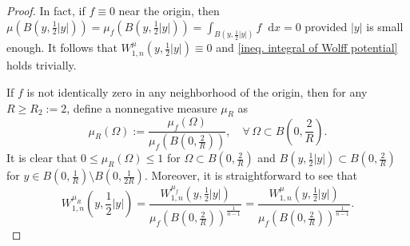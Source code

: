 \documentclass[10pt,a4paper]{amsart}
\numberwithin{equation}{section}
\newcommand{\dx}{\mathop{}\!\mathrm{d}x}
\begin{document}
\begin{proof}
    In fact, if $f\equiv 0$ near the origin, then $\mu(B(y,\frac{1}{2}|y|))=\mu_f(B(y,\frac{1}{2}|y|))=\int_{B(y,\frac{1}{2}|y|)}f\dx=0$ provided $|y|$ is small enough. It follows that $W_{1,n}^{\mu}(y,\frac{1}{2}|y|)\equiv 0$ and \cref{ineq. integral of Wolff potential} holds trivially.
    
    If $f$ is not identically zero in any neighborhood of the origin, then for any $R\geq R_2:=2$, define a nonnegative measure $\mu_R$ as 
    \[
        \mu_R(\Omega):=\frac{\mu_f(\Omega)}{\mu_f(B(0,\frac{2}{R}))},\quad \forall \,\Omega\subset 
        B\left(0,\frac{2}{R}\right).
    \]
    It is clear that $0\leq\mu_R(\Omega)\leq 1$ for $\Omega\subset B(0,\frac{2}{R})$ and $B(y,\frac{1}{2}|y|)\subset B(0,\frac{2}{R})$ for $y\in B(0,\frac{1}{R})\setminus B(0,\frac{1}{2R})$. Moreover, it is straightforward to see that 
    \[
        W_{1,n}^{\mu_R}(y,\frac{1}{2}|y|)
        =\frac{W_{1,n}^{\mu_f}(y,\frac{1}{2}|y|)}{\mu_f(B(0,\frac{2}{R}))^{\frac{1}{n-1}}}
        =\frac{W_{1,n}^{\mu}(y,\frac{1}{2}|y|)}{\mu_f(B(0,\frac{2}{R}))^{\frac{1}{n-1}}}.
    \]


\end{proof}
\end{document}
